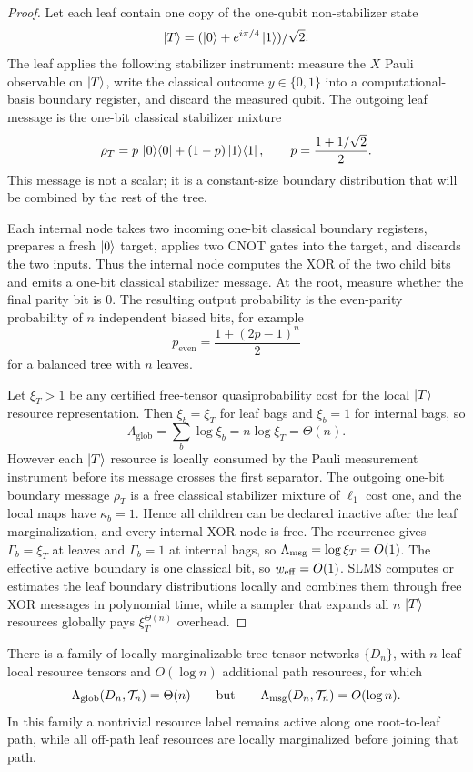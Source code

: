 \begin{proof}
Let each leaf contain one copy of the one-qubit non-stabilizer state
\[
\left|T\right\rangle=(\left|0\right\rangle+e^{i\pi/4}\left|1\right\rangle)/\sqrt2 .
\]
The leaf applies the following stabilizer instrument: measure the \(X\) Pauli observable on \(\left|T\right\rangle\), write the classical outcome \(y\in\{0,1\}\) into a computational-basis boundary register, and discard the measured qubit. The outgoing leaf message is the one-bit classical stabilizer mixture
\[
\rho_T
=p\,\left|0\right\rangle\!\left\langle0\right|+(1-p)\left|1\right\rangle\!\left\langle1\right|,
\qquad
p=\frac{1+1/\sqrt2}{2}.
\]
This message is not a scalar; it is a constant-size boundary distribution that will be combined by the rest of the tree.

Each internal node takes two incoming one-bit classical boundary registers, prepares a fresh \(\left|0\right\rangle\) target, applies two CNOT gates into the target, and discards the two inputs. Thus the internal node computes the XOR of the two child bits and emits a one-bit classical stabilizer message. At the root, measure whether the final parity bit is \(0\). The resulting output probability is the even-parity probability of \(n\) independent biased bits, for example
\[
p_{\mathrm{even}}=\frac{1+(2p-1)^n}{2}
\]
for a balanced tree with \(n\) leaves.

Let \(\xi_T>1\) be any certified free-tensor quasiprobability cost for the local \(\left|T\right\rangle\) resource representation. Then \(\xi_b=\xi_T\) for leaf bags and \(\xi_b=1\) for internal bags, so
\[
\Lambda_{\mathrm{glob}}=\sum_b\log\xi_b=n\log\xi_T=\Theta(n).
\]
However each \(\left|T\right\rangle\) resource is locally consumed by the Pauli measurement instrument before its message crosses the first separator. The outgoing one-bit boundary message \(\rho_T\) is a free classical stabilizer mixture of \(\ell_1\) cost one, and the local maps have \(\kappa_b=1\). Hence all children can be declared inactive after the leaf marginalization, and every internal XOR node is free. The recurrence gives \(\Gamma_b=\xi_T\) at leaves and \(\Gamma_b=1\) at internal bags, so \(\Lambda_{\mathrm{msg}}=\log\xi_T=O(1)\). The effective active boundary is one classical bit, so \(w_{\mathrm{eff}}=O(1)\). SLMS computes or estimates the leaf boundary distributions locally and combines them through free XOR messages in polynomial time, while a sampler that expands all \(n\) \(\left|T\right\rangle\) resources globally pays \(\xi_T^{\Theta(n)}\) overhead.
\end{proof}

\begin{example}
\label{prop:path-active-improvement}
There is a family of locally marginalizable tree tensor networks \(\{D_n\}\), with \(n\) leaf-local resource tensors and \(O(\log n)\) additional path resources, for which
\[
\Lambda_{\mathrm{glob}}(D_n,\mathcal{T}_n)=\Theta(n)
\qquad\text{but}\qquad
\Lambda_{\mathrm{msg}}(D_n,\mathcal{T}_n)=O(\log n).
\]
In this family a nontrivial resource label remains active along one root-to-leaf path, while all off-path leaf resources are locally marginalized before joining that path.
\end{example}


